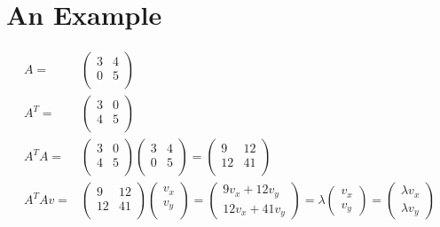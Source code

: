 \documentclass{article}
\begin{document}
\section{An Example }
\begin{align*}
    A=      & \begin{pmatrix}
        3 & 4 \\0&5\\
    \end{pmatrix}                                                                                                                 \\
    A^T=    & \begin{pmatrix}
        3 & 0 \\4&5\\
    \end{pmatrix}                                                                                                                 \\
    A^T A=  & \begin{pmatrix}
        3 & 0 \\4&5\\
    \end{pmatrix}\begin{pmatrix}
        3 & 4 \\0&5\\
    \end{pmatrix}=\begin{pmatrix}
        9 & 12 \\12&41\\
    \end{pmatrix}                                                              \\
    A^T Av= & \begin{pmatrix}
        9 & 12 \\12&41\\
    \end{pmatrix}\begin{pmatrix}
        v_x \\v_y\\
    \end{pmatrix}=\begin{pmatrix}
        9v_x + 12v_y \\12v_x +41v_y
    \end{pmatrix}=\lambda\begin{pmatrix}
        v_x \\v_y
    \end{pmatrix}=\begin{pmatrix}
        \lambda v_x \\\lambda v_y
    \end{pmatrix} \\
\end{align*}
\end{document}
